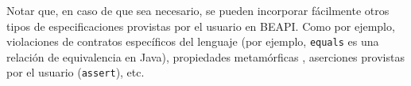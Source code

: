 
Notar que, en caso de que sea necesario, se pueden incorporar fácilmente otros
tipos de especificaciones provistas por el usuario en \textsf{BEAPI}. Como por ejemplo, violaciones de contratos específicos del lenguaje (por ejemplo, \texttt{equals} es una relación de equivalencia en Java), propiedades metamórficas \cite{Chen19}, aserciones provistas por el usuario (\texttt{assert}), etc.



